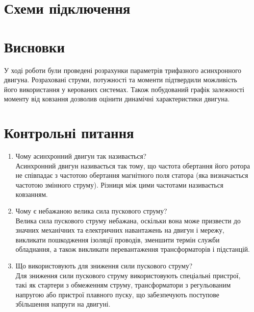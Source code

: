 \documentclass[a4paper]{article}
\begin{document}
    \section*{Схеми підключення}

    \section*{Висновки}
    У ході роботи були проведені розрахунки параметрів трифазного асинхронного двигуна.
    Розраховані струми, потужності та моменти підтвердили можливість його використання у керованих системах.
    Також побудований графік залежності моменту від ковзання дозволив оцінити динамічні характеристики двигуна.

    \section*{Контрольні питання}
\begin{enumerate}
    \item Чому асинхронний двигун так називається? \\
    Асинхронний двигун називається так тому, що частота обертання його ротора не співпадає з частотою обертання магнітного поля статора (яка визначається частотою змінного струму). Різниця між цими частотами називається ковзанням.
    
    \item Чому є небажаною велика сила пускового струму? \\
    Велика сила пускового струму небажана, оскільки вона може призвести до значних механічних та електричних навантажень на двигун і мережу, викликати пошкодження ізоляції проводів, зменшити термін служби обладнання, а також викликати перевантаження трансформаторів і підстанцій.
    
    \item Що використовують для зниження сили пускового струму? \\
    Для зниження сили пускового струму використовують спеціальні пристрої, такі як стартери з обмеженням струму, трансформатори з регульованим напругою або пристрої плавного пуску, що забезпечують поступове збільшення напруги на двигуні.
\end{enumerate}
\end{document}
